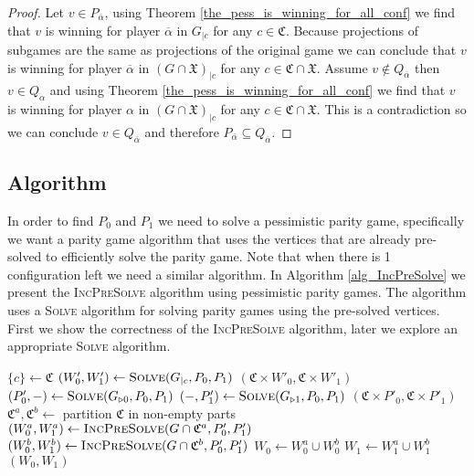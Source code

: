 \begin{lemma}
\begin{proof}
		
		Let $v \in P_{\overline{\alpha}}$, using Theorem \ref{the_pess_is_winning_for_all_conf} we find that $v$ is winning for player $\overline{\alpha}$ in $G_{|c}$ for any $c \in \mathfrak{C}$. Because projections of subgames are the same as projections of the original game we can conclude that $v$ is winning for player $\overline{\alpha}$ in $(G \cap \mathfrak{X})_{|c}$ for any $c \in \mathfrak{C} \cap \mathfrak{X}$.	Assume $v \notin Q_{\overline{\alpha}}$ then $v \in Q_{\alpha}$ and using Theorem \ref{the_pess_is_winning_for_all_conf} we find that $v$ is winning for player $\alpha$ in $(G \cap \mathfrak{X})_{|c}$ for any $c \in \mathfrak{C} \cap \mathfrak{X}$. This is a contradiction so we can conclude $v \in Q_{\overline{\alpha}}$ and therefore $P_{\overline{\alpha}} \subseteq Q_{\overline{\alpha}}$.
	\end{proof}
\end{lemma}
\subsection{Algorithm}
In order to find $P_0$ and $P_1$ we need to solve a pessimistic parity game, specifically we want a parity game algorithm that uses the vertices that are already pre-solved to efficiently solve the parity game. Note that when there is 1 configuration left we need a similar algorithm. In Algorithm \ref{alg_IncPreSolve} we present the \textsc{IncPreSolve} algorithm using pessimistic parity games. The algorithm uses a \textsc{Solve} algorithm for solving parity games using the pre-solved vertices. First we show the correctness of the \textsc{IncPreSolve} algorithm, later we explore an appropriate \textsc{Solve} algorithm.
\begin{algorithm}
	\caption{$\textsc{IncPreSolve}(G = (V,V_0,V_1, E, \Omega, \mathfrak{C}, \theta), P_0,P_1)$}\label{alg_IncPreSolve}
	\begin{algorithmic}[1]
		\State $\{c\} \gets \mathfrak{C}$
		\State $(W'_0,W'_1) \gets \textsc{Solve}(G_{|c}, P_0,P_1)$
		\State \Return $(\mathfrak{C} \times W'_0, \mathfrak{C} \times W'_1)$
		\EndIf
		\State $(P'_0,-) \gets \textsc{Solve}(G_{\triangleright0}, P_0, P_1)$
		\State $(-,P'_1) \gets \textsc{Solve}(G_{\triangleright1}, P_0, P_1)$
		\State \Return $(\mathfrak{C} \times P'_0, \mathfrak{C} \times P'_1)$
		\EndIf
		\State $\mathfrak{C}^a, \mathfrak{C}^b \gets $ partition $\mathfrak{C}$ in non-empty parts
		\State $(W_0^a, W_1^a) \gets \textsc{IncPreSolve}(G \cap \mathfrak{C}^a, P'_0,P'_1)$
		\State $(W_0^b, W_1^b) \gets \textsc{IncPreSolve}(G \cap \mathfrak{C}^b, P'_0,P'_1)$
		\State $W_0 \gets W_0^a \cup W_0^b$
		\State $W_1 \gets W_1^a \cup W_1^b$
		\State \Return $(W_0,W_1)$
	\end{algorithmic}
\end{algorithm}


